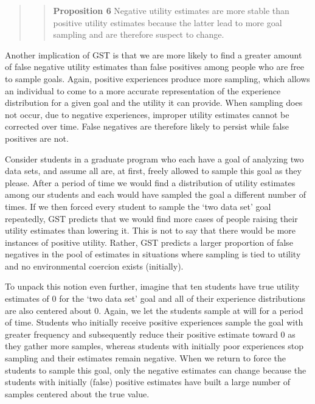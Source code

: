 \documentclass[english,,man]{apa6}
\theoremstyle{definition}
\theoremstyle{definition}
\theoremstyle{definition}
\theoremstyle{remark}
\begin{document}
\begin{quote}
\begin{quote}
\textbf{Proposition 6} Negative utility estimates are more stable than
positive utility estimates because the latter lead to more goal sampling
and are therefore suspect to change.
\end{quote}
\end{quote}

Another implication of GST is that we are more likely to find a greater
amount of false negative utility estimates than false positives among
people who are free to sample goals. Again, positive experiences produce
more sampling, which allows an individual to come to a more accurate
representation of the experience distribution for a given goal and the
utility it can provide. When sampling does not occur, due to negative
experiences, improper utility estimates cannot be corrected over time.
False negatives are therefore likely to persist while false positives
are not.

Consider students in a graduate program who each have a goal of
analyzing two data sets, and assume all are, at first, freely allowed to
sample this goal as they please. After a period of time we would find a
distribution of utility estimates among our students and each would have
sampled the goal a different number of times. If we then forced every
student to sample the `two data set' goal repeatedly, GST predicts that
we would find more cases of people raising their utility estimates than
lowering it. This is not to say that there would be more instances of
positive utility. Rather, GST predicts a larger proportion of false
negatives in the pool of estimates in situations where sampling is tied
to utility and no environmental coercion exists (initially).

To unpack this notion even further, imagine that ten students have true
utility estimates of 0 for the `two data set' goal and all of their
experience distributions are also centered about 0. Again, we let the
students sample at will for a period of time. Students who initially
receive positive experiences sample the goal with greater frequency and
subsequently reduce their positive estimate toward 0 as they gather more
samples, whereas students with initially poor experiences stop sampling
and their estimates remain negative. When we return to force the
students to sample this goal, only the negative estimates can change
because the students with initially (false) positive estimates have
built a large number of samples centered about the true value.
\end{document}
